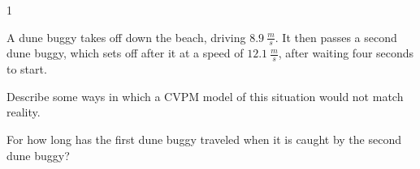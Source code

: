 
\AddToShipoutPicture*{\BackgroundPic}

\addtocounter {ProbNum} {1}

 
{\bf \Large{}}A dune buggy takes off down the beach, driving ${8.9~\tfrac{m}{s}}$.  It then passes a second dune buggy, which sets off after it at a speed of ${12.1~\tfrac{m}{s}}$, after waiting four seconds to start.

\bigskip
Describe some ways in which a CVPM model of this situation would not match reality.

\vspace{30 mm}
For how long has the first dune buggy traveled when it is caught by the second dune buggy?

 
\vfill

\newpage